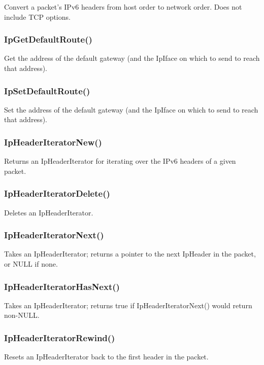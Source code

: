 \documentclass{article}
\begin{document}
Convert a packet's IPv6 headers from host order to network
order.  Does not include TCP options.

\subsubsection{IpGetDefaultRoute()}

Get the address of the default gateway (and the IpIface on which to
send to reach that address).

\subsubsection{IpSetDefaultRoute()}

Set the address of the default gateway (and the IpIface on which to
send to reach that address).

\subsubsection{IpHeaderIteratorNew()}

Returns an IpHeaderIterator for iterating over the IPv6 headers of a
given packet.

\subsubsection{IpHeaderIteratorDelete()}

Deletes an IpHeaderIterator.

\subsubsection{IpHeaderIteratorNext()}

Takes an IpHeaderIterator; returns a pointer to the next IpHeader in
the packet, or NULL if none.

\subsubsection{IpHeaderIteratorHasNext()}

Takes an IpHeaderIterator; returns true if IpHeaderIteratorNext()
would return non-NULL.

\subsubsection{IpHeaderIteratorRewind()}

Resets an IpHeaderIterator back to the first header in the packet.
\end{document}

